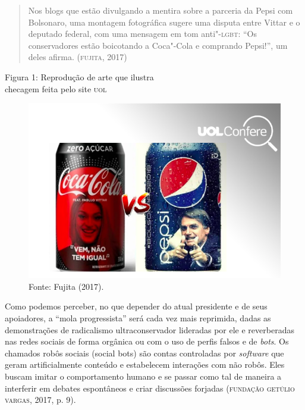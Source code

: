 \begin{quote}
Nos blogs que estão divulgando a mentira sobre a parceria da Pepsi com
Bolsonaro, uma montagem fotográfica sugere uma disputa entre Vittar e o
deputado federal, com uma mensagem em tom anti"-\textsc{lgbt}: ``Os conservadores
estão boicotando a Coca"-Cola e comprando Pepsi!'', um deles afirma.
(\textsc{fujita}, 2017)
\end{quote}

\pagebreak
\begin{center}
Figura 1: Reprodução de arte que ilustra\\ checagem feita pelo site \textsc{uol}

\begin{figure}[!ht]
\centering
 \includegraphics[width=\textwidth]{./imgs/fig3.png}
\caption{Fonte: Fujita (2017).}
\end{figure}
\end{center}

Como podemos perceber, no que depender do atual presidente e de seus
apoiadores, a ``mola progressista'' será cada vez mais reprimida, dadas
as demonstrações de radicalismo ultraconservador lideradas por ele e
reverberadas nas redes sociais de forma orgânica ou com o uso de perfis
falsos e de \emph{bots}. Os chamados robôs sociais (social bots) são
contas controladas por \emph{\emph{software}} que geram artificialmente conteúdo e
estabelecem interações com não robôs. Eles buscam imitar o comportamento
humano e se passar como tal de maneira a interferir em debates
espontâneos e criar discussões forjadas (\textsc{fundação getúlio vargas}, 2017,
p. 9).

